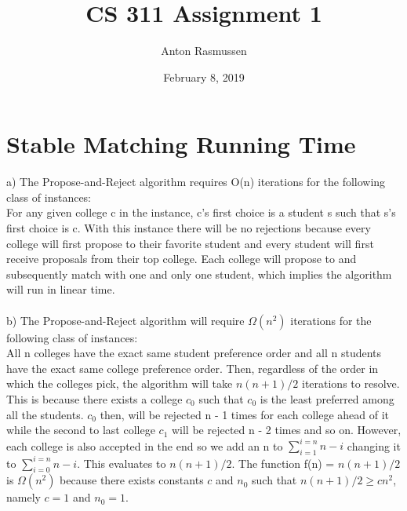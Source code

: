 \documentclass{article}
\title{CS 311 Assignment 1}
\author{Anton Rasmussen}
\date{February 8, 2019}
\begin{document}
\maketitle

\section{Stable Matching Running Time}
a) The Propose-and-Reject algorithm requires O(n) iterations for the following class of instances:\\ For any given college c in the instance, c's first choice is a student s such that s's first choice is c. With this instance there will be no rejections because every college will first propose to their favorite student and every student will first receive proposals from their top college. Each college will propose to and subsequently match with one and only one student, which implies the algorithm will run in linear time.\\\\
b) The Propose-and-Reject algorithm will require $\Omega(n^2)$ iterations for the following class of instances:\\ All n colleges have the exact same student preference order and all n students have the exact same college preference order. Then, regardless of the order in which the colleges pick, the algorithm will take $n(n + 1)/2$ iterations to resolve. This is because there exists a college $c_0$ such that $c_0$ is the least preferred among all the students. $c_0$ then, will be rejected n - 1 times for each college ahead of it while the second to last college $c_1$ will be rejected n - 2 times and so on. However, each college is also accepted in the end so we add an n to $\sum_{i = 1}^{i = n} n - i$ changing it to $\sum_{i = 0}^{i = n} n - i$. This evaluates to $n(n + 1)/2$. The function f(n) = $n(n + 1)/2$ is $\Omega(n^2)$ because there exists constants $c$ and $n_0$ such that $n(n + 1)/2 \geq cn^2$, namely $c = 1$ and $n_0 = 1$.
\end{document}
